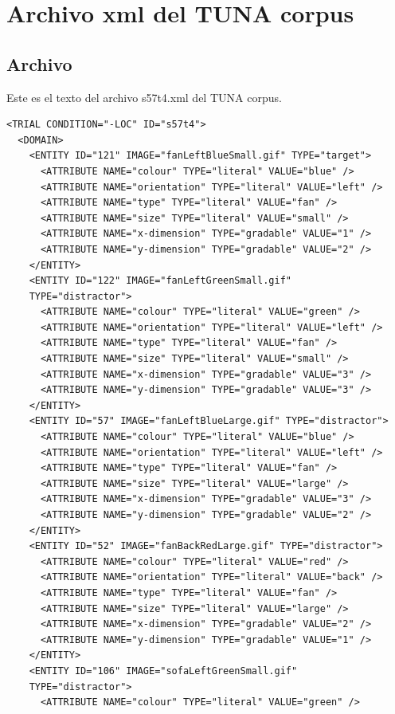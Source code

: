 \appendix


\chapter{Archivo xml del TUNA corpus}
\section{Archivo}
\label{archivos-xml-tuna}

Este es el texto del archivo s57t4.xml del TUNA corpus.
\begin{verbatim}
<TRIAL CONDITION="-LOC" ID="s57t4">
  <DOMAIN>
    <ENTITY ID="121" IMAGE="fanLeftBlueSmall.gif" TYPE="target">
      <ATTRIBUTE NAME="colour" TYPE="literal" VALUE="blue" />
      <ATTRIBUTE NAME="orientation" TYPE="literal" VALUE="left" />
      <ATTRIBUTE NAME="type" TYPE="literal" VALUE="fan" />
      <ATTRIBUTE NAME="size" TYPE="literal" VALUE="small" />
      <ATTRIBUTE NAME="x-dimension" TYPE="gradable" VALUE="1" />
      <ATTRIBUTE NAME="y-dimension" TYPE="gradable" VALUE="2" />
    </ENTITY>
    <ENTITY ID="122" IMAGE="fanLeftGreenSmall.gif"
    TYPE="distractor">
      <ATTRIBUTE NAME="colour" TYPE="literal" VALUE="green" />
      <ATTRIBUTE NAME="orientation" TYPE="literal" VALUE="left" />
      <ATTRIBUTE NAME="type" TYPE="literal" VALUE="fan" />
      <ATTRIBUTE NAME="size" TYPE="literal" VALUE="small" />
      <ATTRIBUTE NAME="x-dimension" TYPE="gradable" VALUE="3" />
      <ATTRIBUTE NAME="y-dimension" TYPE="gradable" VALUE="3" />
    </ENTITY>
    <ENTITY ID="57" IMAGE="fanLeftBlueLarge.gif" TYPE="distractor">
      <ATTRIBUTE NAME="colour" TYPE="literal" VALUE="blue" />
      <ATTRIBUTE NAME="orientation" TYPE="literal" VALUE="left" />
      <ATTRIBUTE NAME="type" TYPE="literal" VALUE="fan" />
      <ATTRIBUTE NAME="size" TYPE="literal" VALUE="large" />
      <ATTRIBUTE NAME="x-dimension" TYPE="gradable" VALUE="3" />
      <ATTRIBUTE NAME="y-dimension" TYPE="gradable" VALUE="2" />
    </ENTITY>
    <ENTITY ID="52" IMAGE="fanBackRedLarge.gif" TYPE="distractor">
      <ATTRIBUTE NAME="colour" TYPE="literal" VALUE="red" />
      <ATTRIBUTE NAME="orientation" TYPE="literal" VALUE="back" />
      <ATTRIBUTE NAME="type" TYPE="literal" VALUE="fan" />
      <ATTRIBUTE NAME="size" TYPE="literal" VALUE="large" />
      <ATTRIBUTE NAME="x-dimension" TYPE="gradable" VALUE="2" />
      <ATTRIBUTE NAME="y-dimension" TYPE="gradable" VALUE="1" />
    </ENTITY>
    <ENTITY ID="106" IMAGE="sofaLeftGreenSmall.gif"
    TYPE="distractor">
      <ATTRIBUTE NAME="colour" TYPE="literal" VALUE="green" />

\end{verbatim}
